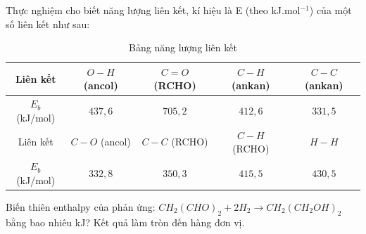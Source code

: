 \documentclass[Main.tex]{subfiles}
\begin{document}
\begin{bt}
	Thực nghiệm cho biết năng lượng liên kết, kí hiệu là E (theo kJ.mol$^{-1}$) của một số liên kết như sau:
	
	\begin{table}[h]
		\centering
		\begin{tabular}{|c|c|c|c|c|}
			\hline
			Liên kết & $O-H$ (ancol) & $C=O$ (RCHO) & $C-H$ (ankan) & $C-C$ (ankan) \\
			\hline
			$E_b$ (kJ/mol) & $437{,}6$ & $705{,}2$ & $412{,}6$ & $331{,}5$ \\
			\hline
			Liên kết & $C-O$ (ancol) & $C-C$ (RCHO) & $C-H$ (RCHO) & $H-H$ \\
			\hline
			$E_b$ (kJ/mol) & $332{,}8$ & $350{,}3$ & $415{,}5$ & $430{,}5$ \\
			\hline
		\end{tabular}
		\caption{Bảng năng lượng liên kết}
		\label{bang_nang_luong_lien_ket_21}
	\end{table}
	
	Biến thiên enthalpy của phản ứng: $CH_2(CHO)_2 + 2H_2 \longrightarrow CH_2(CH_2OH)_2$ bằng bao nhiêu kJ? Kết quả làm tròn đến hàng đơn vị.
\end{bt}
\end{document}
